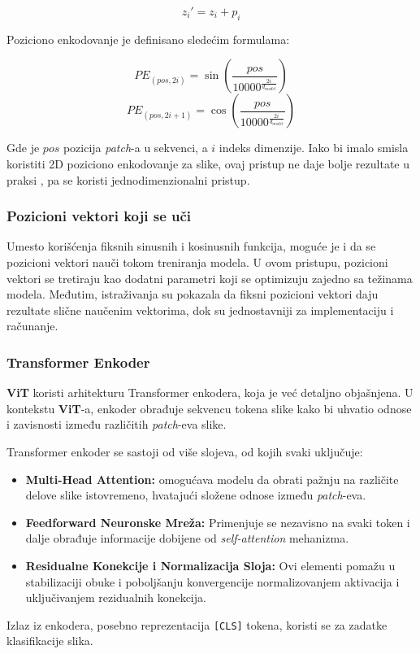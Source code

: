 \documentclass[12pt]{article}
\begin{document}
   \[
   z_i' = z_i + p_i
   \]

   Poziciono enkodovanje je definisano sledećim formulama:

   \[
   PE_{(pos, 2i)} = \sin\left(\frac{pos}{10000^{\frac{2i}{d_{model}}}}\right)
   \]
   \[
   PE_{(pos, 2i+1)} = \cos\left(\frac{pos}{10000^{\frac{2i}{d_{model}}}}\right)
   \]

   Gde je \( pos \) pozicija \textit{patch}-a u sekvenci, a \( i \) indeks dimenzije. 
   Iako bi imalo smisla koristiti 2D poziciono enkodovanje za slike, ovaj pristup ne daje bolje
   rezultate u praksi \cite{vit}, pa se koristi jednodimenzionalni pristup.

   \subsubsection*{Pozicioni vektori koji se uči}
   Umesto korišćenja fiksnih sinusnih i kosinusnih funkcija, moguće je i da se 
   pozicioni vektori nauči tokom treniranja modela. U ovom pristupu, 
   pozicioni vektori se tretiraju kao dodatni parametri koji se optimizuju zajedno sa 
   težinama modela. Međutim, istraživanja su pokazala da fiksni pozicioni vektori daju 
   rezultate slične naučenim vektorima, dok su jednostavniji za implementaciju i računanje.


   \subsubsection{Transformer Enkoder}
   \textbf{ViT} koristi arhitekturu Transformer enkodera, koja je već detaljno objašnjena. U 
   kontekstu \textbf{ViT}-a, enkoder obrađuje sekvencu tokena slike kako bi uhvatio odnose 
   i zavisnosti između različitih \textit{patch}-eva slike.

   Transformer enkoder se sastoji od više slojeva, od kojih svaki uključuje:
\begin{itemize}
    \item \textbf{Multi-Head Attention:} omogućava modelu da obrati pažnju na različite 
    delove slike istovremeno, hvatajući složene odnose između \textit{patch}-eva.
    \item \textbf{Feedforward Neuronske Mreža:} Primenjuje se nezavisno na svaki token i 
    dalje obrađuje informacije dobijene od \textit{self-attention} mehanizma.
    \item \textbf{Residualne Konekcije i Normalizacija Sloja:} Ovi elementi pomažu u 
    stabilizaciji obuke i poboljšanju konvergencije normalizovanjem aktivacija i 
    uključivanjem rezidualnih konekcija.
\end{itemize}
   Izlaz iz enkodera, posebno reprezentacija \texttt{[CLS]} tokena, koristi se za zadatke klasifikacije slika. 
\end{document}

